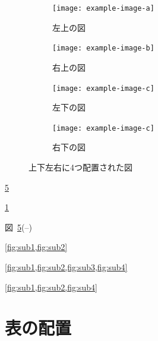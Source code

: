 \begin{figure}[tp]
    \centering
    \begin{subfigure}{0.45\textwidth}
        \centering
        \texttt{[image: example-image-a]}
        \caption{左上の図}
        \label{fig:sub1}
    \end{subfigure}
    \hfill %
    \begin{subfigure}{0.45\textwidth}
        \centering
        \texttt{[image: example-image-b]}
        \caption{右上の図}
        \label{fig:sub2}
    \end{subfigure}
    
    \vspace{5mm} %
    
    \begin{subfigure}[b]{0.45\textwidth}
        \centering
        \texttt{[image: example-image-c]}
        \caption{左下の図}
        \label{fig:sub3}
    \end{subfigure}
    \hfill %
    \begin{subfigure}[b]{0.45\textwidth}
        \centering
        \texttt{[image: example-image-c]}
        \caption{右下の図}
        \label{fig:sub4}
    \end{subfigure}
    \caption{上下左右に4つ配置された図}
    \label{fig:four_subfigures}
\end{figure}


\ref{fig:four_subfigures}

\ref{fig:sub1}

図~\ref{fig:four_subfigures}(--)


\cref{fig:sub1,fig:sub2}

\cref{fig:sub1,fig:sub2,fig:sub3,fig:sub4}

\cref{fig:sub1,fig:sub2,fig:sub4}


\section{表の配置}
\label{sec:table}




